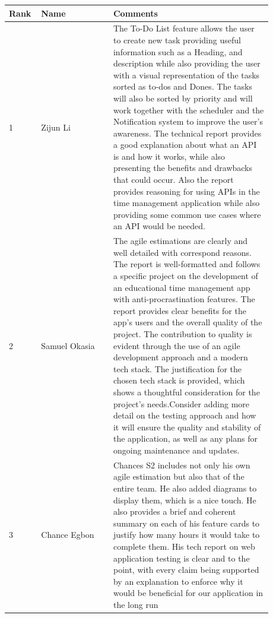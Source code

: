 \documentclass[a4paper]{article}
\begin{document}
{\noindent\begin{tabular}{|p{0.075\linewidth}|p{0.25\linewidth}|p{0.55\linewidth}|} 
	\hline
 \textbf{Rank} & \textbf{Name} & \textbf{Comments} \\
 \hline
 1 & Zijun Li & The To-Do List feature allows the user to create new task providing useful information such as a Heading, and description while also providing the user with a visual  representation of the tasks sorted as to-dos and Dones. The tasks will also be sorted by priority and will work together with the scheduler and the Notification system to improve the user's awareness. The technical report provides a good explanation about what an API is and how it works, while also presenting the benefits and drawbacks that could occur. Also the report provides reasoning for using APIs in the time management application while also providing some common use cases where an API would be needed. \\
 \hline
 2 & Samuel Okasia & The agile estimations are clearly and well detailed with correspond reasons. The report is well-formatted and follows a specific project on the development of an educational time management app with anti-procrastination features.  The report provides clear benefits for the app's users and the overall quality of the project. The contribution to quality is evident through the use of an agile development approach and a modern tech stack. The justification for the chosen tech stack is provided, which shows a thoughtful consideration for the project's needs.Consider adding more detail on the testing approach and how it will ensure the quality and stability of the application, as well as any plans for ongoing maintenance and updates.\\
 \hline
 3 & Chance Egbon& Chances S2 includes not only his own agile estimation but also that of the entire team. He also added diagrams to display them, which is a nice touch. He also provides a brief and coherent summary on each of his feature cards to justify how many hours it would take to complete them. His tech report on web application testing is clear and to the point, with every claim being supported by an explanation to enforce why it would be beneficial for our application in the long run\\
 \hline
\end{tabular}}
\end{document}
